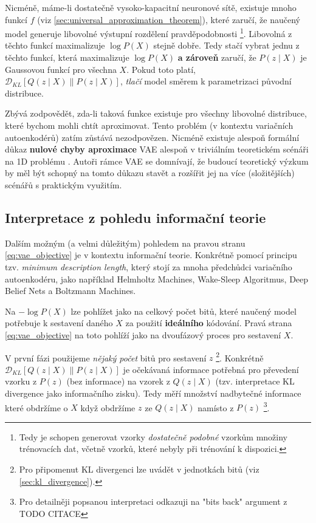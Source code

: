 Nicméně, máme-li dostatečně vysoko-kapacitní neuronové sítě, existuje mnoho funkcí $f$ (viz \autoref{sec:universal_approximation_theorem}), které zaručí, že naučený model generuje libovolné výstupní rozdělení pravděpodobnosti
\footnote{Tedy je schopen generovat vzorky \emph{dostatečně podobné} vzorkům množiny trénovacích dat, včetně vzorků, které nebyly při trénování k dispozici.}.
Libovolná z těchto funkcí maximalizuje $\log P(X)$ stejně dobře. Tedy stačí vybrat jednu z těchto funkcí, která maximalizuje $\log P(X)$ \textbf{a zároveň} zaručí, že $P (z\mid X)$ je Gaussovou funkcí pro všechna $X$.
Pokud toto platí, $\mathcal{D}_{KL}\left[ Q(z\mid X) \parallel P(z\mid X) \right]$, \emph{tlačí} model směrem k parametrizaci původní distribuce.

Zbývá zodpovědět, zda-li taková funkce existuje pro všechny libovolné distribuce, které bychom mohli chtít aproximovat.
Tento problém (v kontextu variačních autoenkodérů) zatím zůstává nezodpovězen. Nicméně existuje alespoň formální důkaz \textbf{nulové chyby aproximace} VAE alespoň v triviálním teoretickém scénáři na 1D problému \cite[Příloha A]{Doersch2021}.
Autoři rámce VAE se domnívají, že budoucí teoretický výzkum by měl být schopný na tomto důkazu stavět a rozšířit jej na více (složitějších) scénářů s praktickým využitím. 

\subsection{Interpretace z pohledu informační teorie}
\label{sec:vae_information_theory_interpretation}
Dalším možným (a velmi důležitým) pohledem na pravou stranu \autoref{eq:vae_objective} je v kontextu informační teorie.
Konkrétně pomocí principu tzv. \emph{minimum description length}, který stojí za mnoha předchůdci variačního autoenkodéru, jako například Helmholtz Machines, Wake-Sleep Algoritmus, Deep Belief Nets a Boltzmann Machines.

Na $- \log P(X)$ lze pohlížet jako na celkový počet bitů, které naučený model potřebuje k sestavení daného $X$ za použití \textbf{ideálního} kódování.
Pravá strana \autoref{eq:vae_objective} na toto pohlíží jako na dvoufázový proces pro sestavení $X$.

V první fázi použijeme \emph{nějaký počet} bitů pro sestavení $z$ \footnote{Pro připomenut KL divergenci lze uvádět v jednotkách bitů (viz \autoref{sec:kl_divergence}).}.
Konkrétně $\mathcal{D}_{KL}\left[ Q(z\mid X) \parallel P(z\mid X) \right]$ je očekávaná informace potřebná pro převedení vzorku z $P(z)$ (bez informace) na vzorek z $Q(z\mid X)$ (tzv. interpretace KL divergence jako informačního zisku).
Tedy měří množství nadbytečné informace které obdržíme o $X$ když obdržíme $z$ ze $Q(z\mid X)$ namísto z $P(z)$
\footnote{Pro detailněji popsanou interpretaci odkazuji na "bits back" argument z TODO CITACE }.

